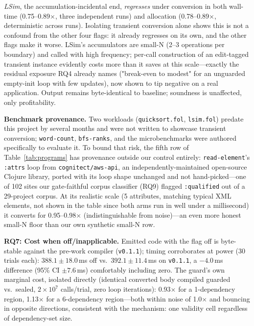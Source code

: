 \documentclass[sigplan,review,anonymous]{acmart}
\begin{document}
\emph{LSim}, the accumulation-incidental end, \emph{regresses} under conversion in both wall-time (0.75--0.89$\times$, three independent runs) and allocation (0.78--0.89$\times$, deterministic across runs). Isolating transient conversion alone shows this is not a confound from the other four flags: it already regresses on its own, and the other flags make it worse. LSim's accumulators are small-N (2--3 operations per boundary) and called with high frequency; per-call construction of an edit-tagged transient instance evidently costs more than it saves at this scale---exactly the residual exposure RQ4 already names ("break-even to modest" for an unguarded empty-init loop with few updates), now shown to tip negative on a real application. Output remains byte-identical to baseline; soundness is unaffected, only profitability.

\textbf{Benchmark provenance.} Two workloads (\texttt{quicksort.fol}, \texttt{lsim.fol}) predate this project by several months and were not written to showcase transient conversion; \texttt{word-count}, \texttt{bfs-ranks}, and the microbenchmarks were authored specifically to evaluate it. To bound that risk, the fifth row of Table~\ref{tab:programs} has provenance outside our control entirely: \texttt{read-element}'s \texttt{:attrs} loop from \texttt{cognitect/aws-api}, an independently-maintained open-source Clojure library, ported with its loop shape unchanged and not hand-picked---one of 102 sites our gate-faithful corpus classifier (RQ9) flagged \texttt{:qualified} out of a 29-project corpus. At its realistic scale (5 attributes, matching typical XML elements, not shown in the table since both arms run in well under a millisecond) it converts for 0.95--0.98$\times$ (indistinguishable from noise)---an even more honest small-N floor than our own synthetic small-N row.

\textbf{RQ7: Cost when off/inapplicable.} Emitted code with the flag off is byte-stable against the pre-work compiler (\texttt{v0.1.1}); timing corroborates at power (30 trials each): $388.1\pm18.0$\,ms off vs.\ $392.1\pm11.4$\,ms on \texttt{v0.1.1}, a $-4.0$\,ms difference (95\% CI $\pm7.6$\,ms) comfortably including zero. The guard's own marginal cost, isolated directly (identical converted body compiled guarded vs.\ sealed, $2\times10^7$ calls/trial, zero loop iterations): 0.93$\times$ for a 1-dependency region, 1.13$\times$ for a 6-dependency region---both within noise of 1.0$\times$ and bouncing in opposite directions, consistent with the mechanism: one validity cell regardless of dependency-set size.
\end{document}
